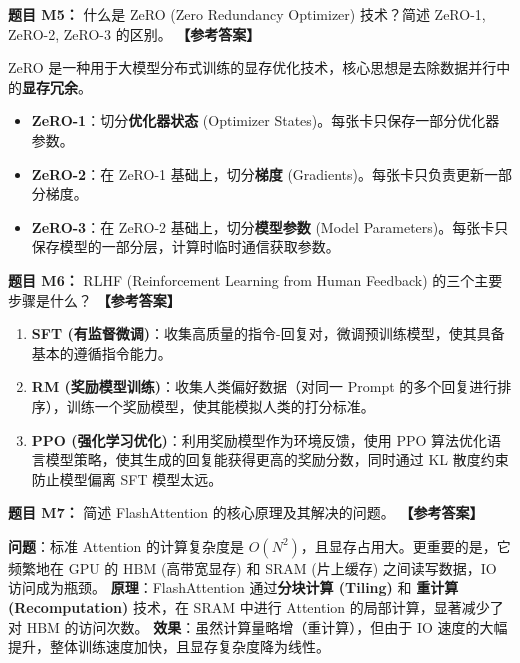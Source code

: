 \documentclass[a4paper,11pt]{article}
\newenvironment{question}[1]
    {\vspace{0.5cm}\noindent\textbf{题目 #1：}}
    {\vspace{0.2cm}}
\newenvironment{answer}
    {\noindent\textbf{【参考答案】}\par\small\color{blue}}
    {\par\vspace{0.5cm}\normalcolor}
\begin{document}
\begin{question}{M5}
什么是 ZeRO (Zero Redundancy Optimizer) 技术？简述 ZeRO-1, ZeRO-2, ZeRO-3 的区别。
\end{question}
\begin{answer}
ZeRO 是一种用于大模型分布式训练的显存优化技术，核心思想是去除数据并行中的\textbf{显存冗余}。
\begin{itemize}
    \item \textbf{ZeRO-1}：切分\textbf{优化器状态} (Optimizer States)。每张卡只保存一部分优化器参数。
    \item \textbf{ZeRO-2}：在 ZeRO-1 基础上，切分\textbf{梯度} (Gradients)。每张卡只负责更新一部分梯度。
    \item \textbf{ZeRO-3}：在 ZeRO-2 基础上，切分\textbf{模型参数} (Model Parameters)。每张卡只保存模型的一部分层，计算时临时通信获取参数。
\end{itemize}
\end{answer}

\begin{question}{M6}
RLHF (Reinforcement Learning from Human Feedback) 的三个主要步骤是什么？
\end{question}
\begin{answer}
\begin{enumerate}
    \item \textbf{SFT (有监督微调)}：收集高质量的指令-回复对，微调预训练模型，使其具备基本的遵循指令能力。
    \item \textbf{RM (奖励模型训练)}：收集人类偏好数据（对同一 Prompt 的多个回复进行排序），训练一个奖励模型，使其能模拟人类的打分标准。
    \item \textbf{PPO (强化学习优化)}：利用奖励模型作为环境反馈，使用 PPO 算法优化语言模型策略，使其生成的回复能获得更高的奖励分数，同时通过 KL 散度约束防止模型偏离 SFT 模型太远。
\end{enumerate}
\end{answer}

\begin{question}{M7}
简述 FlashAttention 的核心原理及其解决的问题。
\end{question}
\begin{answer}
\textbf{问题}：标准 Attention 的计算复杂度是 $O(N^2)$，且显存占用大。更重要的是，它频繁地在 GPU 的 HBM (高带宽显存) 和 SRAM (片上缓存) 之间读写数据，IO 访问成为瓶颈。
\textbf{原理}：FlashAttention 通过\textbf{分块计算 (Tiling)} 和 \textbf{重计算 (Recomputation)} 技术，在 SRAM 中进行 Attention 的局部计算，显著减少了对 HBM 的访问次数。
\textbf{效果}：虽然计算量略增（重计算），但由于 IO 速度的大幅提升，整体训练速度加快，且显存复杂度降为线性。
\end{answer}
\end{document}
